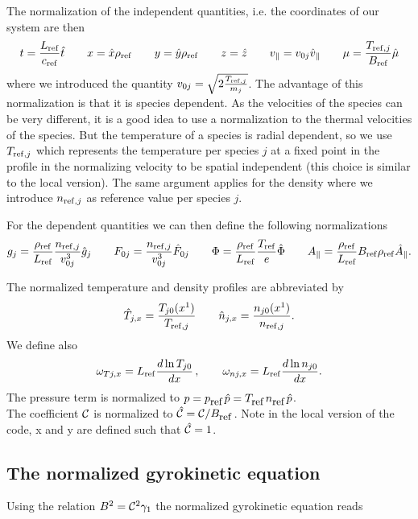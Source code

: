 The normalization of the independent quantities, i.e. the coordinates
of our system are then
\begin{displaymath}
  t=\frac{L_{\mathrm{ref}}}{c_{\mathrm{ref}}}\hat{t}
  \qquad x=\hat{x}\rho_{\mathrm{ref}}
  \qquad y=\hat{y}\rho_{\mathrm{ref}}
  \qquad z=\hat{z}
  \qquad v_\|=v_{0j}\hat{v}_\|
  \qquad \mu = \frac{T_{\mathrm{ref},j}}{B_{\mathrm{ref}}}\hat{\mu}
\end{displaymath}
where we introduced the quantity
$v_{0j}=\sqrt{2\frac{T_{\mathrm{ref},j}}{m_j}}$. The advantage
of this normalization is that it is species dependent. As the
velocities of the species can be very different, it is a good idea to
use a normalization to the thermal velocities of the species. But the
temperature of a species is radial dependent, so we use
$T_{\mathrm{ref},j}$ which represents the temperature per species $j$ at a 
fixed point in the profile in the normalizing velocity to be spatial
independent (this choice is similar to the local version). The same
argument applies for the density where we introduce $n_{\mathrm{ref},j}$ as
reference value per species $j$.

For the dependent quantities we can then define the following
normalizations
\begin{displaymath}
  g_j=\frac{\rho_{\mathrm{ref}}}{L_{\mathrm{ref}}}\frac{n_{\mathrm{ref},j}}{v_{0j}^3}\hat{g}_j
  \qquad F_{0j}=\frac{n_{\mathrm{ref},j}}{v_{0j}^3}\hat{F}_{0j}
  \qquad \Phi=\frac{\rho_{\mathrm{ref}}}{L_{\mathrm{ref}}}\frac{T_{\mathrm{ref}}}{e}\hat{\Phi}
  \qquad A_\|=\frac{\rho_{\mathrm{ref}}}{L_{\mathrm{ref}}}B_{\mathrm{ref}}\rho_{\mathrm{ref}}\hat{A}_\|.
\end{displaymath}

The normalized temperature and density profiles are abbreviated by
\begin{displaymath}
  \hat{T}_{j,x} = \frac{T_{j0}(x^1)}{T_{\mathrm{ref},j}}  
  \qquad \hat{n}_{j,x} = \frac{n_{j0}(x^1)}{n_{\mathrm{ref},j}}.
\end{displaymath}
We define also 
\begin{displaymath}
  \omega _{Tj,x} = L_{\mathrm{ref}}\frac{d \ln T_{j0}}{dx}\, ,\qquad
  \omega _{nj,x} = L_{\mathrm{ref}}\frac{d \ln n_{j0}}{dx}.
\end{displaymath}
The pressure term is normalized to $p=p _{\mbox{\small ref\,}} \hat{p}=T _{\mbox{\small ref\,}} n _{\mbox{\small ref\,}} \hat{p}$. \\
The coefficient $\mathcal{C}$ is normalized to $\hat{\mathcal{C}}=\mathcal{C}/B_{\mbox{\small ref\,}}$. Note in the local version of the code, x and y are defined such that $\hat{\mathcal{C}}=1$.



\subsection{The normalized gyrokinetic equation}
Using the relation $B^2=\mathcal{C}^2 \gamma _1$ the normalized gyrokinetic equation reads

